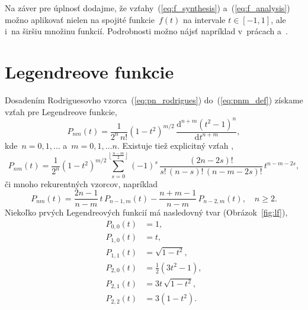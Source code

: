 \documentclass[a4paper, 12pt]{book}
\newcommand{\diff}{\mathrm d}
\begin{document}
Na záver pre úplnosť dodajme, že vzťahy~(\ref{eq:f_synthesis})
a~(\ref{eq:f_analysis}) možno aplikovať nielen na spojité funkcie~$f(t)$ na
intervale $t \in [-1, 1]$, ale i~na širšiu množinu funkcií.  Podrobnosti možno
nájsť napríklad v~prácach \textcite{Freeden2009} a~\textcite{Arfken2005}.






\section{Legendreove funkcie}
\label{sec:legendre_functions}

Dosadením Rodriguesovho vzorca~(\ref{eq:pn_rodrigues}) do~(\ref{eq:pnm_def})
získame vzťah pre Legendreove funkcie,
%
\begin{equation}
\label{eq:pnm_ferrer}
P_{nm}(t) = \frac{1}{2^n \, n!} (1 - t^2)^{ m \slash 2} \, \frac{\diff^{n + m}
(t^2 - 1)^n}{\diff t^{n + m}}{,}
\end{equation}
%
kde~$n = 0, 1, \dots$ a~$m = 0, 1, \dots n$.  Existuje tiež explicitný vzťah 
\parencite{Freeden2009},
%
\begin{equation}
P_{nm}(t) = \frac{1}{2^n}(1 - t^2)^{m \slash 2} \sum_{s = 0}^{\left\lfloor
\frac{n - m}{2} \right\rfloor} (-1)^s \, \frac{(2n - 2s)!}{s! \, (n - s)! \, (n
- m - 2s)!} \, t^{n - m - 2s}{,}
\end{equation}
%
či mnoho rekurentných vzorcov, napríklad \parencite{Freeden2009}
%
\begin{equation}
\label{eq:pnm_recurrence}
P_{nm}(t) = \frac{2n - 1}{n - m} \, t \, P_{n - 1, m}(t) - \frac{n + m - 1}{n
- m} \, P_{n - 2, m}(t){,} \quad n \geq 2{.}
\end{equation}
%
Niekoľko prvých Legendreových funkcií má nasledovný tvar
(Obrázok~\ref{fig:lf}),
%
\begin{equation}
\label{eq:lf00_to_lf22}
\begin{split}
P_{0,0}(t) & = 1{,}\\
P_{1,0}(t) & = t{,}\\
P_{1,1}(t) & = \sqrt{1 - t^2}{,}\\
P_{2,0}(t) & = \frac{1}{2}(3t^2 - 1){,}\\
P_{2,1}(t) & = 3t \, \sqrt{1 - t^2}{,}\\
P_{2,2}(t) & = 3(1 - t^2){.}\\
\end{split}
\end{equation}
\end{document}
